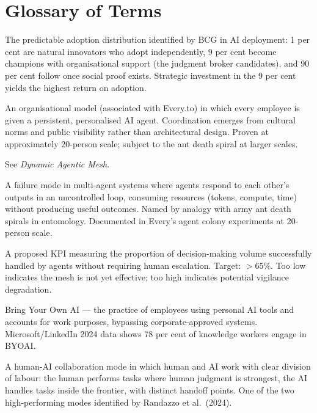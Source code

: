 \chapter{Glossary of Terms}
\label{ch:glossary}

\begin{description}[style=nextline, leftmargin=2em, font=\bfseries\color{navyblue}]

\item[1-9-90 Pattern]
The predictable adoption distribution identified by BCG in AI deployment: 1 per cent are natural innovators who adopt independently, 9 per cent become champions with organisational support (the judgment broker candidates), and 90 per cent follow once social proof exists. Strategic investment in the 9 per cent yields the highest return on adoption.

\item[Agent Colony]
An organisational model (associated with Every.to) in which every employee is given a persistent, personalised AI agent. Coordination emerges from cultural norms and public visibility rather than architectural design. Proven at approximately 20-person scale; subject to the ant death spiral at larger scales.

\item[Agentic Mesh]
See \emph{Dynamic Agentic Mesh}.

\item[Ant Death Spiral]
A failure mode in multi-agent systems where agents respond to each other's outputs in an uncontrolled loop, consuming resources (tokens, compute, time) without producing useful outcomes. Named by analogy with army ant death spirals in entomology. Documented in Every's agent colony experiments at 20-person scale.

\item[Augmentation Ratio (AR)]
A proposed KPI measuring the proportion of decision-making volume successfully handled by agents without requiring human escalation. Target: $>65\%$. Too low indicates the mesh is not yet effective; too high indicates potential vigilance degradation.

\item[BYOAI]
Bring Your Own AI --- the practice of employees using personal AI tools and accounts for work purposes, bypassing corporate-approved systems. Microsoft/LinkedIn 2024 data shows 78 per cent of knowledge workers engage in BYOAI.

\item[Centaur]
A human-AI collaboration mode in which human and AI work with clear division of labour: the human performs tasks where human judgment is strongest, the AI handles tasks inside the frontier, with distinct handoff points. One of the two high-performing modes identified by Randazzo et al.\ (2024).


\end{description}
